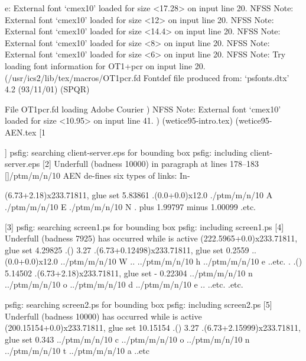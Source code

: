 e: External font `cmex10' loaded for size <17.28> on input line 20.
NFSS Note: External font `cmex10' loaded for size <12> on input line 20.
NFSS Note: External font `cmex10' loaded for size <14.4> on input line 20.
NFSS Note: External font `cmex10' loaded for size <8> on input line 20.
NFSS Note: External font `cmex10' loaded for size <6> on input line 20.
NFSS Note: Try loading font information for OT1+pcr on input line 20.
 (/usr/ics2/lib/tex/macros/OT1pcr.fd
Fontdef file produced from: `psfonts.dtx' 4.2 (93/11/01) (SPQR)

File OT1pcr.fd loading Adobe Courier
)
NFSS Note: External font `cmex10' loaded for size <10.95> on input line 41.
) (wetice95-intro.tex) (wetice95-AEN.tex [1


]
psfig: searching client-server.eps for bounding box
psfig: including client-server.eps 
[2]
Underfull \hbox (badness 10000) in paragraph at lines 178--183
[]/ptm/m/n/10 AEN de-fines six types of links: In-

\hbox(6.73+2.18)x233.71811, glue set 5.83861
.\hbox(0.0+0.0)x12.0
./ptm/m/n/10 A
./ptm/m/n/10 E
./ptm/m/n/10 N
. plus 1.99797 minus 1.00099
.etc.

[3]
psfig: searching screen1.ps for bounding box
psfig: including screen1.ps 
[4]
Underfull \vbox (badness 7925) has occurred while \output is active
\vbox(222.5965+0.0)x233.71811, glue set 4.29825
.\glue(\topskip) 3.27
.\hbox(6.73+0.12498)x233.71811, glue set 0.2559
..\hbox(0.0+0.0)x12.0
../ptm/m/n/10 W
..
../ptm/m/n/10 h
../ptm/m/n/10 e
..etc.
.
.\glue(\baselineskip) 5.14502
.\hbox(6.73+2.18)x233.71811, glue set - 0.22304
../ptm/m/n/10 n
../ptm/m/n/10 o
../ptm/m/n/10 d
../ptm/m/n/10 e
..
..etc.
.etc.


psfig: searching screen2.ps for bounding box
psfig: including screen2.ps 
[5]
Underfull \vbox (badness 10000) has occurred while \output is active
\vbox(200.15154+0.0)x233.71811, glue set 10.15154
.\glue(\topskip) 3.27
.\hbox(6.73+2.15999)x233.71811, glue set 0.343
../ptm/m/n/10 c
../ptm/m/n/10 o
../ptm/m/n/10 n
../ptm/m/n/10 t
../ptm/m/n/10 a
..etc